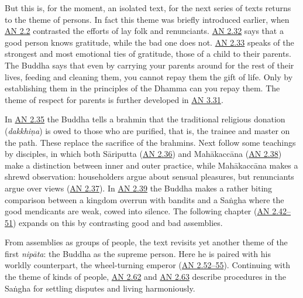 \documentclass[12pt,openany]{book}%
\begin{document}
But this is, for the moment, an isolated text, for the next series of texts returns to the theme of persons. In fact this theme was briefly introduced earlier, when \href{https://suttacentral.net/an2.1{-}10}{AN 2.2} contrasted the efforts of lay folk and renunciants. \href{https://suttacentral.net/an2.32{-}41}{AN 2.32} says that a good person knows gratitude, while the bad one does not. \href{https://suttacentral.net/an2.32{-}41}{AN 2.33} speaks of the strongest and most emotional ties of gratitude, those of a child to their parents. The Buddha says that even by carrying your parents around for the rest of their lives, feeding and cleaning them, you cannot repay them the gift of life. Only by establishing them in the principles of the Dhamma can you repay them. The theme of respect for parents is further developed in \href{https://suttacentral.net/an3.31}{AN 3.31}.

In \href{https://suttacentral.net/an2.32{-}41}{AN 2.35} the Buddha tells a brahmin that the traditional religious donation (\textit{\textsanskrit{dakkhiṇa}}) is owed to those who are purified, that is, the trainee and master on the path. These replace the sacrifice of the brahmins. Next follow some teachings by disciples, in which both \textsanskrit{Sāriputta} (\href{https://suttacentral.net/an2.32{-}41}{AN 2.36}) and \textsanskrit{Mahākaccāna} (\href{https://suttacentral.net/an2.32{-}41}{AN 2.38}) make a distinction between inner and outer practice, while \textsanskrit{Mahākaccāna} makes a shrewd observation: householders argue about sensual pleasures, but renunciants argue over views (\href{https://suttacentral.net/an2.32{-}41}{AN 2.37}). In \href{https://suttacentral.net/an2.32{-}41}{AN 2.39} the Buddha makes a rather biting comparison between a kingdom overrun with bandits and a \textsanskrit{Saṅgha} where the good mendicants are weak, cowed into silence. The following chapter (\href{https://suttacentral.net/an2.42{-}51}{AN 2.42–51}) expands on this by contrasting good and bad assemblies.

From assemblies as groups of people, the text revisits yet another theme of the first \textit{\textsanskrit{nipāta}}: the Buddha as the supreme person. Here he is paired with his worldly counterpart, the wheel-turning emperor (\href{https://suttacentral.net/an2.52{-}63}{AN 2.52–55}). Continuing with the theme of kinds of people, \href{https://suttacentral.net/an2.52{-}63}{AN 2.62} and \href{https://suttacentral.net/an2.52{-}63}{AN 2.63} describe procedures in the \textsanskrit{Saṅgha} for settling disputes and living harmoniously.
\end{document}
